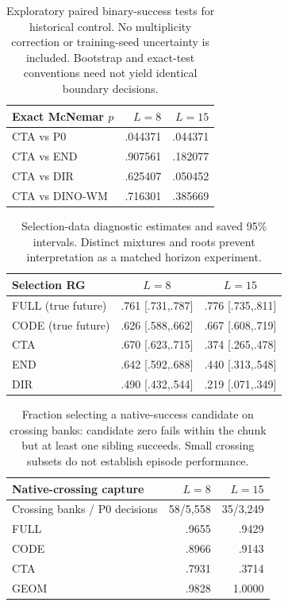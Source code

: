 \documentclass[10pt,twocolumn,letterpaper]{article}
\begin{document}
\begin{table}[t]
\centering\small
\begin{tabular}{lrr}
\toprule
Exact McNemar $p$ & $L=8$ & $L=15$ \\
\midrule
CTA vs P0 & .044371 & .044371 \\
CTA vs END & .907561 & .182077 \\
CTA vs DIR & .625407 & .050452 \\
CTA vs DINO-WM & .716301 & .385669 \\
\bottomrule
\end{tabular}
\caption{Exploratory paired binary-success tests for historical control. No multiplicity correction or training-seed uncertainty is included. Bootstrap and exact-test conventions need not yield identical boundary decisions.}
\end{table}

\begin{table}[t]
\centering\small
\setlength{\tabcolsep}{3pt}
\begin{tabular}{lcc}
\toprule
Selection RG & $L=8$ & $L=15$ \\
\midrule
FULL (true future) & .761 [.731,.787] & .776 [.735,.811] \\
CODE (true future) & .626 [.588,.662] & .667 [.608,.719] \\
CTA & .670 [.623,.715] & .374 [.265,.478] \\
END & .642 [.592,.688] & .440 [.313,.548] \\
DIR & .490 [.432,.544] & .219 [.071,.349] \\
\bottomrule
\end{tabular}
\caption{Selection-data diagnostic estimates and saved 95\% intervals. Distinct mixtures and roots prevent interpretation as a matched horizon experiment.}
\end{table}

\begin{table}[t]
\centering\small
\begin{tabular}{lrr}
\toprule
Native-crossing capture & $L=8$ & $L=15$ \\
\midrule
Crossing banks / P0 decisions & 58/5,558 & 35/3,249 \\
FULL & .9655 & .9429 \\
CODE & .8966 & .9143 \\
CTA & .7931 & .3714 \\
GEOM & .9828 & 1.0000 \\
\bottomrule
\end{tabular}
\caption{Fraction selecting a native-success candidate on crossing banks: candidate zero fails within the chunk but at least one sibling succeeds. Small crossing subsets do not establish episode performance.}
\end{table}
\end{document}
